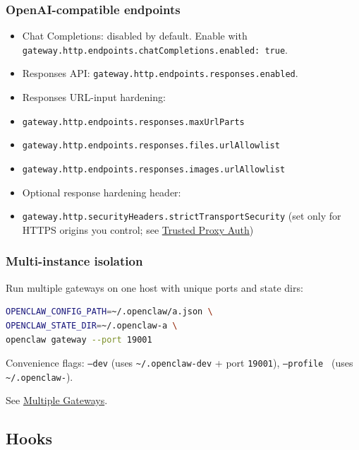 \subsubsection{OpenAI-compatible endpoints}


\begin{itemize}
  \item Chat Completions: disabled by default. Enable with \texttt{gateway.http.endpoints.chatCompletions.enabled: true}.
  \item Responses API: \texttt{gateway.http.endpoints.responses.enabled}.
  \item Responses URL-input hardening:
  \item \texttt{gateway.http.endpoints.responses.maxUrlParts}
  \item \texttt{gateway.http.endpoints.responses.files.urlAllowlist}
  \item \texttt{gateway.http.endpoints.responses.images.urlAllowlist}
  \item Optional response hardening header:
  \item \texttt{gateway.http.securityHeaders.strictTransportSecurity} (set only for HTTPS origins you control; see \href{/gateway/trusted-proxy-auth\#tls-termination-and-hsts}{Trusted Proxy Auth})
\end{itemize}


\subsubsection{Multi-instance isolation}


Run multiple gateways on one host with unique ports and state dirs:

\begin{lstlisting}[language=bash]
OPENCLAW_CONFIG_PATH=~/.openclaw/a.json \
OPENCLAW_STATE_DIR=~/.openclaw-a \
openclaw gateway --port 19001
\end{lstlisting}


Convenience flags: \texttt{--dev} (uses \texttt{\textasciitilde{}/.openclaw-dev} + port \texttt{19001}), \texttt{--profile } (uses \texttt{\textasciitilde{}/.openclaw-}).

See \href{/gateway/multiple-gateways}{Multiple Gateways}.

\hrulefill


\subsection{Hooks}


